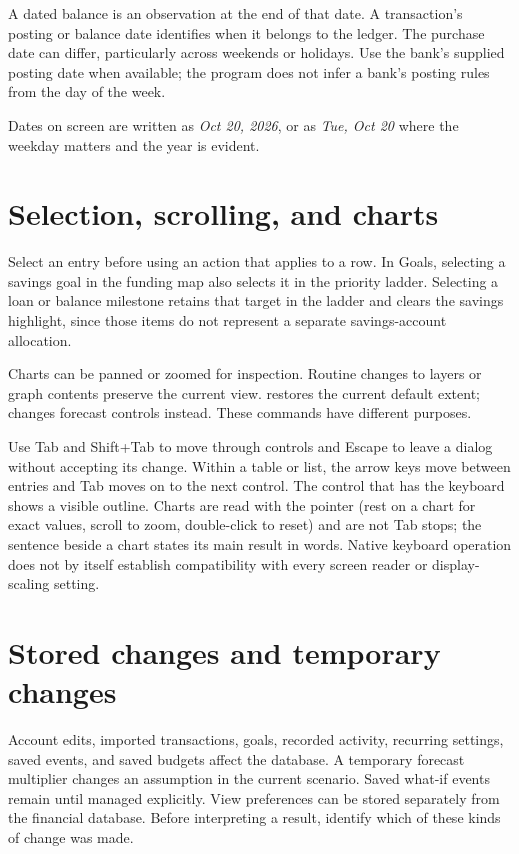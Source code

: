 A dated balance is an observation at the end of that date. A transaction's posting or balance date identifies when it belongs to the ledger. The purchase date can differ, particularly across weekends or holidays. Use the bank's supplied posting date when available; the program does not infer a bank's posting rules from the day of the week.

Dates on screen are written as \textit{Oct 20, 2026}, or as \textit{Tue, Oct 20} where the weekday matters and the year is evident.

\section{Selection, scrolling, and charts}
Select an entry before using an action that applies to a row. In Goals, selecting a savings goal in the funding map also selects it in the priority ladder. Selecting a loan or balance milestone retains that target in the ladder and clears the savings highlight, since those items do not represent a separate savings-account allocation.

Charts can be panned or zoomed for inspection. Routine changes to layers or graph contents preserve the current view.  restores the current default extent;  changes forecast controls instead. These commands have different purposes.

Use Tab and Shift+Tab to move through controls and Escape to leave a dialog without accepting its change. Within a table or list, the arrow keys move between entries and Tab moves on to the next control. The control that has the keyboard shows a visible outline. Charts are read with the pointer (rest on a chart for exact values, scroll to zoom, double-click to reset) and are not Tab stops; the sentence beside a chart states its main result in words. Native keyboard operation does not by itself establish compatibility with every screen reader or display-scaling setting.

\section{Stored changes and temporary changes}
Account edits, imported transactions, goals, recorded activity, recurring settings, saved events, and saved budgets affect the database. A temporary forecast multiplier changes an assumption in the current scenario. Saved what-if events remain until managed explicitly. View preferences can be stored separately from the financial database. Before interpreting a result, identify which of these kinds of change was made.


